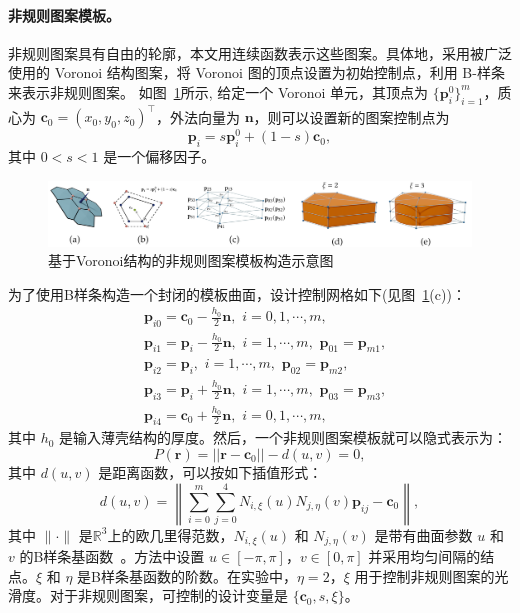 \paragraph{非规则图案模板。}
非规则图案具有自由的轮廓，本文用连续函数表示这些图案。具体地，采用被广泛使用的 Voronoi 结构图案，将 Voronoi 图的顶点设置为初始控制点，利用 B-样条来表示非规则图案。
如图~\ref{fig-irregular}所示, 给定一个 Voronoi 单元，其顶点为 $\{\mathbf{p}^0_i\}_{i=1}^m$，质心为 $\mathbf{c}_0=(x_0,y_0,z_0)^\top$，外法向量为 $\mathbf{n}$，则可以设置新的图案控制点为
\begin{equation}
	\mathbf{p}_i=s\mathbf{p}^0_i+(1-s)\mathbf{c}_0,
\end{equation}
其中 $0<s<1$ 是一个偏移因子。
\begin{figure}[htbp]
    \centering
    \includegraphics[width=1.0\linewidth]{./figures/iregular-pattern}
    \caption{基于Voronoi结构的非规则图案模板构造示意图}
    \label{fig-irregular}
\end{figure}
为了使用B样条构造一个封闭的模板曲面，设计控制网格如下(见图~\ref{fig-irregular}(c))：
\begin{equation}
	\begin{split}
	&\mathbf{p}_{i0}=\mathbf{c}_0-\frac{h_0}{2}\mathbf{n},\,\,i=0,1,\cdots,m,\\
	&\mathbf{p}_{i1}=\mathbf{p}_i-\frac{h_0}{2}\mathbf{n},\,\,i=1,\cdots,m,\,\,\mathbf{p}_{01}=\mathbf{p}_{m1}, \\
	&\mathbf{p}_{i2}=\mathbf{p}_i,\,\,i=1,\cdots,m,\,\,\mathbf{p}_{02}=\mathbf{p}_{m2}, \\	
	&\mathbf{p}_{i3}=\mathbf{p}_i+\frac{h_0}{2}\mathbf{n},\,\,i=1,\cdots,m,\,\,\mathbf{p}_{03}=\mathbf{p}_{m3}, \\
	&\mathbf{p}_{i4}=\mathbf{c}_0+\frac{h_0}{2}\mathbf{n},\,\,i=0,1,\cdots,m,
	\end{split}
\end{equation}
其中 $h_0$ 是输入薄壳结构的厚度。然后，一个非规则图案模板就可以隐式表示为：
\begin{equation}
	P(\mathbf{r})=||\mathbf{r}-\mathbf{c}_0||-d(u,v)=0,
\end{equation}
其中 $d(u,v)$ 是距离函数，可以按如下插值形式：
 \begin{equation}
 	d(u,v)=\left\|\sum_{i=0}^m\sum_{j=0}^4N_{i,\xi}(u)N_{j,\eta}(v)\mathbf{p}_{ij}-\mathbf{c}_0\right\|,
 \end{equation}
其中 $\|\cdot\|$ 是$\mathbb{R}^3$上的欧几里得范数，$N_{i,\xi}(u)$ 和 $N_{j,\eta}(v)$ 是带有曲面参数 $u$ 和 $v$ 的B样条基函数~\cite{cohen2001}。方法中设置 $u\in[-\pi, \pi]$，$v\in[0, \pi]$ 并采用均匀间隔的结点。$\xi$ 和 $\eta$ 是B样条基函数的阶数。在实验中，$\eta=2$，$\xi$ 用于控制非规则图案的光滑度。对于非规则图案，可控制的设计变量是 $\{\mathbf{c}_0, s,\xi\}$。

